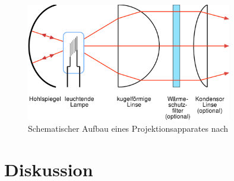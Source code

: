 \documentclass[11pt, a4paper]{article}
\begin{document}
    \begin{figure}[h]
        \centering
        \includegraphics[width=0.8\textwidth]{Condensor-1-de.svg.png}
        \caption{Schematischer Aufbau eines Projektionsapparates nach \cite{projektionsapparat}}
        \label{fig:projektionsapparat}
    \end{figure}




    \section{Diskussion}

    
    
\end{document}
